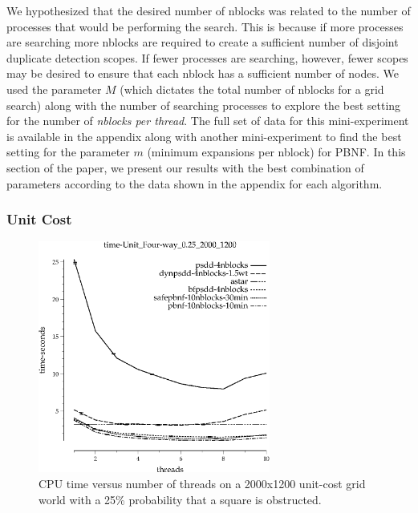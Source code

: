 \documentclass{article}
\begin{document}
 We hypothesized that the desired number of nblocks was related to the
 number of processes that would be performing the search.  This is
 because if more processes are searching more nblocks are required to
 create a sufficient number of disjoint duplicate detection scopes.  If
 fewer processes are searching, however, fewer scopes may be desired to
 ensure that each nblock has a sufficient number of nodes.  We used the
 parameter $M$ (which dictates the total number of nblocks for a grid
 search) along with the number of searching processes to explore the
 best setting for the number of \emph{nblocks per thread}.  The full
 set of data for this mini-experiment is available in the appendix
 along with another mini-experiment to find the best setting for the
 parameter $m$ (minimum expansions per nblock) for PBNF.  In this
 section of the paper, we present our results with the best combination
 of parameters according to the data shown in the appendix for each
 algorithm.

 \subsubsection{Unit Cost}

 \begin{figure}[t]
 \includegraphics[width=3in]{images/grid-time-unit-fourway-025-2000-1200}
 \caption{CPU time versus number of threads on a 2000x1200 unit-cost
   grid world with a 25\% probability that a square is obstructed.}
 \label{fig:grid-unit}
 \end{figure}
\end{document}
